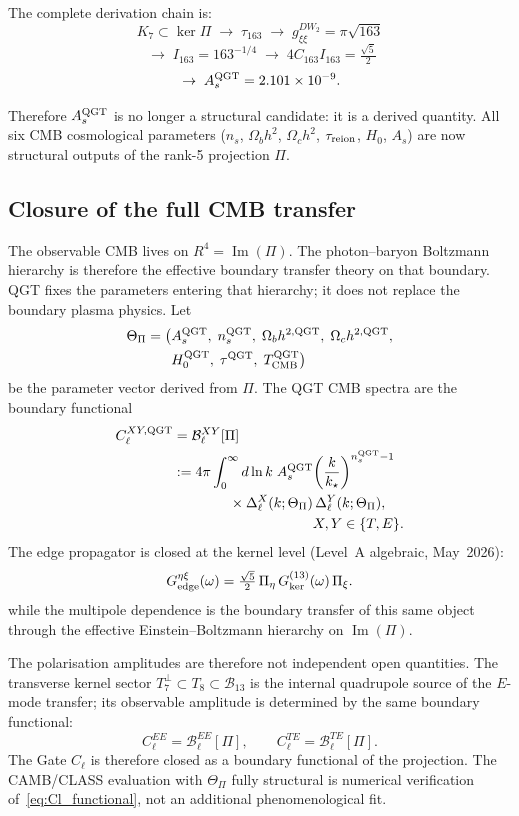 \documentclass[twocolumn,10pt]{article}
\begin{document}
The complete derivation chain is:
\[
  K_7\subset\ker\Pi
  \;\to\; \tau_{163}
  \;\to\; g^{DW_2}_{\xi\xi}=\pi\sqrt{163}
\]
\[
  \;\to\; I_{163}=163^{-1/4}
  \;\to\; 4C_{163}I_{163}=\tfrac{\sqrt{5}}{2}
\]
\[
  \;\to\; A_s^{\rm QGT}=2.101\times10^{-9}.
\]

Therefore $A_s^{\rm QGT}$ is no longer a structural candidate:
it is a derived quantity. All six CMB cosmological parameters
($n_s$, $\Omega_bh^2$, $\Omega_ch^2$, $\tau_{\rm reion}$,
$H_0$, $A_s$) are now structural outputs of the rank-5
projection $\Pi$.

\subsection*{Closure of the full CMB transfer}
\label{sec:multipole_closure}

The observable CMB lives on $R^4=\operatorname{Im}(\Pi)$.
The photon--baryon Boltzmann hierarchy is therefore the effective
boundary transfer theory on that boundary. QGT fixes the parameters
entering that hierarchy; it does not replace the boundary plasma physics.
Let
\begin{align*}
  \Theta_\Pi = \bigl(&A_s^{\rm QGT},\;n_s^{\rm QGT},\;
  \Omega_bh^{2,{\rm QGT}},\;\Omega_ch^{2,{\rm QGT}},\\
  &H_0^{\rm QGT},\;\tau^{\rm QGT},\;
  T_{\rm CMB}^{\rm QGT}\bigr)
\end{align*}
be the parameter vector derived from $\Pi$. The QGT CMB spectra are
the boundary functional
\begin{align}
  C_\ell^{XY,{\rm QGT}}
  &= \mathcal{B}_\ell^{XY}[\Pi] \notag\\
  &:= 4\pi\int_0^\infty d\ln k\;
  A_s^{\rm QGT}
  \!\left(\frac{k}{k_\star}\right)^{n_s^{\rm QGT}-1}\notag\\
  &\hspace{4em}\times
  \Delta_\ell^X(k;\Theta_\Pi)\,
  \Delta_\ell^Y(k;\Theta_\Pi),
  \notag\\
  &\hspace{10em} X,Y\in\{T,E\}.
  \label{eq:Cl_functional}
\end{align}
The edge propagator is closed at the kernel level
(Level~A algebraic, May~2026):
\[
  G^{\eta\xi}_{\rm edge}(\omega)
  =\tfrac{\sqrt{5}}{2}\,\Pi_\eta\,G_{\rm ker}^{(13)}(\omega)\,\Pi_\xi.
\]
while the multipole dependence is the boundary transfer of this same
object through the effective Einstein--Boltzmann hierarchy on
$\operatorname{Im}(\Pi)$.

The polarisation amplitudes are therefore not independent open
quantities. The transverse kernel sector
$T_7^\perp\subset T_8\subset\mathcal{B}_{13}$ is the internal
quadrupole source of the $E$-mode transfer; its observable amplitude
is determined by the same boundary functional:
\[
  C_\ell^{EE}=\mathcal{B}_\ell^{EE}[\Pi],\qquad
  C_\ell^{TE}=\mathcal{B}_\ell^{TE}[\Pi].
\]
The Gate $C_\ell$ is therefore closed as a boundary functional of the
projection. The CAMB/CLASS evaluation with $\Theta_\Pi$ fully structural
is numerical verification of~\eqref{eq:Cl_functional}, not an additional
phenomenological fit.
\end{document}
